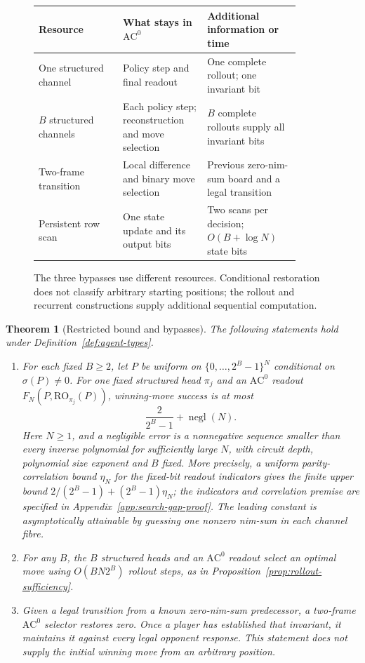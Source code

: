 \documentclass[11pt]{article}
\newcommand{\AC}{\mathrm{AC}}
\theoremstyle{plain}
\newtheorem{theorem}{Theorem}[section]
\theoremstyle{definition}
\theoremstyle{remark}
\numberwithin{equation}{section}
\begin{document}
\begin{figure}[t]
\centering
\begin{tabular}{>{\raggedright\arraybackslash}p{0.28\linewidth}>{\raggedright\arraybackslash}p{0.29\linewidth}>{\raggedright\arraybackslash}p{0.31\linewidth}}
\hline
\textbf{Resource} & \textbf{What stays in $\AC^0$} & \textbf{Additional information or time} \\
\hline
One structured channel & Policy step and final readout & One complete rollout; one invariant bit \\
$B$ structured channels & Each policy step; reconstruction and move selection & $B$ complete rollouts supply all invariant bits \\
Two-frame transition & Local difference and binary move selection & Previous zero-nim-sum board and a legal transition \\
Persistent row scan & One state update and its output bits & Two scans per decision; $O(B+\log N)$ state bits \\
\hline
\end{tabular}
\caption{The three bypasses use different resources. Conditional restoration does not classify arbitrary starting positions; the rollout and recurrent constructions supply additional sequential computation.}
\label{fig:rollout_gap}
\end{figure}

\begin{theorem}[Restricted bound and bypasses]
\label{thm:search-gap}
The following statements hold under Definition~\ref{def:agent-types}.
\begin{enumerate}
\item[\textup{(i)}] For each fixed $B\ge2$, let $P$ be uniform on $\{0,\ldots,2^B-1\}^N$ conditional on $\sigma(P)\ne0$. For one fixed structured head $\pi_j$ and an $\AC^0$ readout $F_N(P,\mathrm{RO}_{\pi_j}(P))$, winning-move success is at most
\[
\frac{2}{2^B-1}+\operatorname{negl}(N).
\]
Here $N\ge1$, and a negligible error is a nonnegative sequence smaller than every inverse polynomial for sufficiently large $N$, with circuit depth, polynomial size exponent and $B$ fixed. More precisely, a uniform parity-correlation bound $\eta_N$ for the fixed-bit readout indicators gives the finite upper bound $2/(2^B-1)+(2^B-1)\eta_N$; the indicators and correlation premise are specified in Appendix~\ref{app:search-gap-proof}. The leading constant is asymptotically attainable by guessing one nonzero nim-sum in each channel fibre.
\item[\textup{(ii)}] For any $B$, the $B$ structured heads and an $\AC^0$ readout select an optimal move using $O(BN2^B)$ rollout steps, as in Proposition~\ref{prop:rollout-sufficiency}.
\item[\textup{(iii)}] Given a legal transition from a known zero-nim-sum predecessor, a two-frame $\AC^0$ selector restores zero. Once a player has established that invariant, it maintains it against every legal opponent response. This statement does not supply the initial winning move from an arbitrary position.
\end{enumerate}
\end{theorem}
\end{document}

